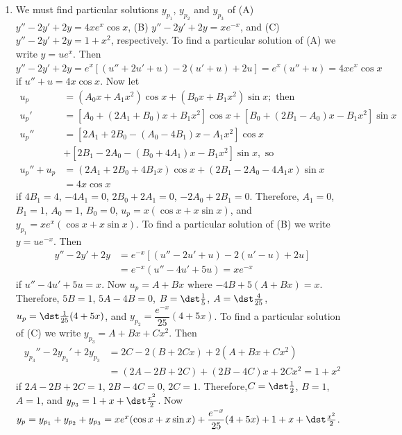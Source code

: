 \documentclass[openany]{book}
\newenvironment{sectionSolutions}{
 \begin{enumerate}[item-label={\thesection.\arabic{enumi}.}]
}{
 \end{enumerate}
}
\begin{document}
\begin{sectionSolutions}
\item
We must find particular solutions $y_{p_1}$, $y_{p_2}$ and $y_{p_3}$
of
(A) $y''-2y'+2y=4xe^x\cos x$,
(B) $y''-2y'+2y=xe^{-x}$, and
(C) $y''-2y'+2y=1+x^2$, respectively.
To find a particular solution of (A) we write $y=ue^x$. Then
$y''-2y'+2y=e^x\left[(u''+2u'+u)-2(u'+u)+2u\right]=e^x(u''+u)=
4xe^x\cos x$ if $u''+u=4x\cos x$. Now let
\begin{align*}
u_p&=(A_0x+A_1x^2)\cos x+(B_0x+B_1x^2)\sin x;\text{ then}\\
u_p'&=\left[A_0+(2A_1+B_0)x+B_1x^2\right]\cos x
+\left[B_0+(2B_1-A_0)x-B_1x^2\right]\sin x\\
u_p''&=\left[2A_1+2B_0-(A_0-4B_1)x-A_1x^2\right]\cos x\\
&+\left[2B_1-2A_0-(B_0+4A_1)x-B_1x^2\right]\sin x, \text{ so}\\
u_p''+u_p&=(2A_1+2B_0+4B_1x)\cos x+(2B_1-2A_0-4A_1x)\sin x\\
&=4x\cos x
\end{align*}
if $4B_1=4$, $-4A_1=0$, $2B_0+2A_1=0$, $-2A_0+2B_1=0$. Therefore,
$A_1=0$, $B_1=1$, $A_0=1$, $B_0=0$, $u_p=x(\cos x+x\sin x)$, and
$y_{p_1}=xe^x(\cos x+x\sin x)$. To find a particular solution of (B)
we write $y=ue^{-x}$. Then
\begin{align*}
y''-2y'+2y&=e^{-x}\left[(u''-2u'+u)-2(u'-u)+2u\right]\\
&=e^{-x}(u''-4u'+5u)=xe^{-x}
\end{align*}
if $u''-4u'+5u=x$. Now $u_p=A+Bx$ where $-4B+5(A+Bx)=x$. Therefore,
$5B=1$, $5A-4B=0$, $B=\dst\frac{1}{5}$, $A=\dst\frac{4}{25}$,
$u_p=\dst\frac{1}{25}(4+5x)$, and $y_{p_2}=\dfrac{e^{-x}}{25}(4+5x)$.
To find a particular solution of (C) we write $y_{p_3}=A+Bx+Cx^2$.
Then
\begin{align*}
y_{p_3}''-2y_{p_3}'+2y_{p_3}&=2C-2(B+2Cx)+2(A+Bx+Cx^2)\\
&=(2A-2B+2C)+(2B-4C)x+2Cx^2=1+x^2
\end{align*}
if $2A-2B+2C=1$, $2B-4C=0$, $2C=1$. Therefore,$C=\dst\frac{1}{2}$,
$B=1$, $A=1$, and $y_{p_3}=1+x+\dst\frac{x^2}{2}$. Now
$y_p=y_{p_1}+y_{p_2}+y_{p_3}= xe^x(\cos x+x\sin
x)+\dfrac{e^{-x}}{25}(4+5x)+1+x+\dst\frac{x^2}{2}$.



\end{sectionSolutions}
\end{document}
